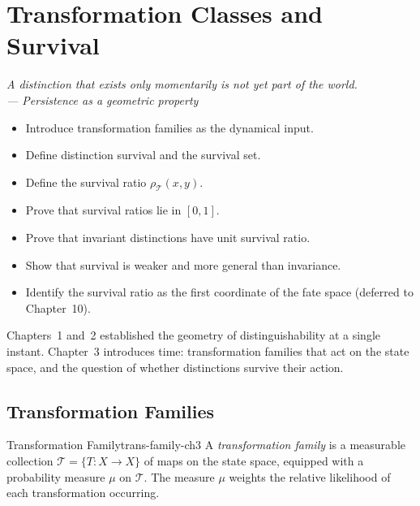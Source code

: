 \documentclass[12pt,twoside,openright]{book}
\newcommand{\transfam}{\mathcal{T}}       %
\newcommand{\survRatio}{\rho}             %
\newenvironment{epigraph}[2]{%
  \vspace{1em}\begin{flushright}
  \begin{minipage}{0.72\textwidth}
  \itshape\small #1\\[0.4em]
  \upshape\footnotesize\sffamily\color{DistGray}--- #2
  \end{minipage}\end{flushright}\vspace{1.5em}}{}
\newenvironment{objectives}{%
  \begin{tcolorbox}[colback=DistBlue!5,colframe=DistBlue,
    title={\faCheckCircle\enspace Chapter Objectives},
    fonttitle=\sffamily\bfseries\color{white},
    attach boxed title to top left={yshift=-2mm,xshift=4mm},
    boxed title style={colback=DistBlue},breakable]
  \begin{itemize}[leftmargin=*,nosep]}{%
  \end{itemize}\end{tcolorbox}\vspace{1em}}
\begin{document}

\chapter{Transformation Classes and Survival}
\label{ch:transformation-survival}

\begin{epigraph}{A distinction that exists only momentarily is
  not yet part of the world.}{Persistence as a geometric
  property}
\end{epigraph}

\begin{objectives}
\item Introduce transformation families as the dynamical input.
\item Define distinction survival and the survival set.
\item Define the survival ratio $\survRatio_\transfam(x,y)$.
\item Prove that survival ratios lie in $[0,1]$.
\item Prove that invariant distinctions have unit survival ratio.
\item Show that survival is weaker and more general than
  invariance.
\item Identify the survival ratio as the first coordinate of
  the fate space (deferred to Chapter~10).
\end{objectives}

Chapters~1 and~2 established the geometry of distinguishability
at a single instant. Chapter~3 introduces time: transformation
families that act on the state space, and the question of
whether distinctions survive their action.

\section{Transformation Families}

\begin{definition}{Transformation Family}{trans-family-ch3}
A \emph{transformation family} is a measurable collection
$\transfam=\{T:X\to X\}$ of maps on the state space,
equipped with a probability measure $\mu$ on $\transfam$.
The measure $\mu$ weights the relative likelihood of each
transformation occurring.
\end{definition}
\end{document}
